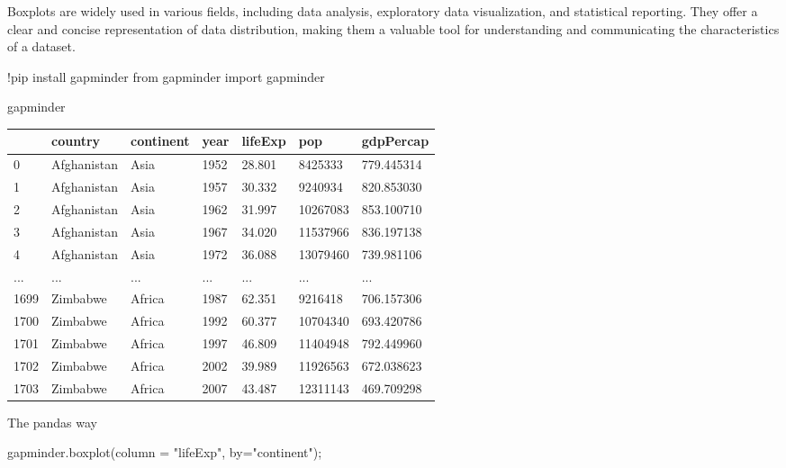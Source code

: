 \documentclass[
  letterpaper,
  DIV=11,
  numbers=noendperiod]{scrreprt}
\newenvironment{Shaded}{\begin{snugshade}}{\end{snugshade}}
\newcommand{\ImportTok}[1]{\textcolor[rgb]{0.00,0.46,0.62}{#1}}
\newcommand{\NormalTok}[1]{\textcolor[rgb]{0.00,0.23,0.31}{#1}}
\newcommand{\OperatorTok}[1]{\textcolor[rgb]{0.37,0.37,0.37}{#1}}
\newcommand{\StringTok}[1]{\textcolor[rgb]{0.13,0.47,0.30}{#1}}
\begin{document}
Boxplots are widely used in various fields, including data analysis,
exploratory data visualization, and statistical reporting. They offer a
clear and concise representation of data distribution, making them a
valuable tool for understanding and communicating the characteristics of
a dataset.

\begin{Shaded}
\begin{Highlighting}[]
\OperatorTok{!}\NormalTok{pip install gapminder}
\ImportTok{from}\NormalTok{ gapminder }\ImportTok{import}\NormalTok{ gapminder}
\end{Highlighting}
\end{Shaded}

\begin{Shaded}
\begin{Highlighting}[]
\NormalTok{gapminder}
\end{Highlighting}
\end{Shaded}

\begin{longtable}[]{@{}lllllll@{}}
\toprule()
& country & continent & year & lifeExp & pop & gdpPercap \\
\midrule()
\endhead
0 & Afghanistan & Asia & 1952 & 28.801 & 8425333 & 779.445314 \\
1 & Afghanistan & Asia & 1957 & 30.332 & 9240934 & 820.853030 \\
2 & Afghanistan & Asia & 1962 & 31.997 & 10267083 & 853.100710 \\
3 & Afghanistan & Asia & 1967 & 34.020 & 11537966 & 836.197138 \\
4 & Afghanistan & Asia & 1972 & 36.088 & 13079460 & 739.981106 \\
... & ... & ... & ... & ... & ... & ... \\
1699 & Zimbabwe & Africa & 1987 & 62.351 & 9216418 & 706.157306 \\
1700 & Zimbabwe & Africa & 1992 & 60.377 & 10704340 & 693.420786 \\
1701 & Zimbabwe & Africa & 1997 & 46.809 & 11404948 & 792.449960 \\
1702 & Zimbabwe & Africa & 2002 & 39.989 & 11926563 & 672.038623 \\
1703 & Zimbabwe & Africa & 2007 & 43.487 & 12311143 & 469.709298 \\
\bottomrule()
\end{longtable}

The pandas way

\begin{Shaded}
\begin{Highlighting}[]
\NormalTok{gapminder.boxplot(column }\OperatorTok{=} \StringTok{"lifeExp"}\NormalTok{, by}\OperatorTok{=}\StringTok{"continent"}\NormalTok{)}\OperatorTok{;}
\end{Highlighting}
\end{Shaded}
\end{document}
